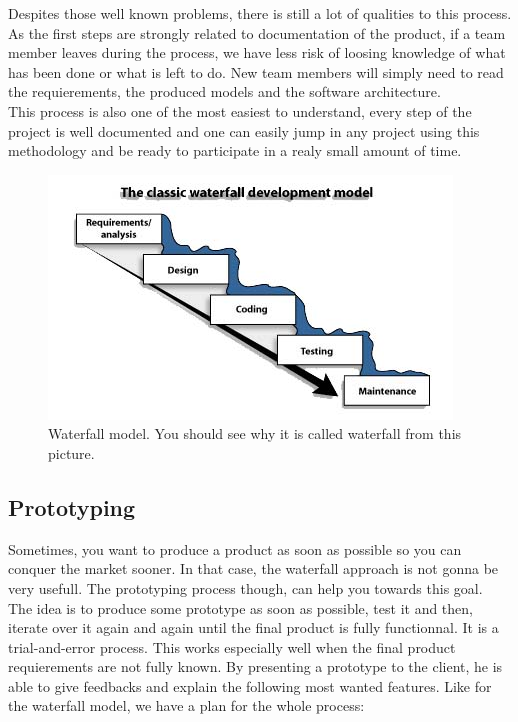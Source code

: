 \documentclass[12pt]{article}
\begin{document}
Despites those well known problems, there is still a lot of qualities to this process. As the first steps are strongly related to documentation of the product, if a team member leaves during the process, we have less risk of loosing knowledge of what has been done or what is left to do. New team members will simply need to read the requierements, the produced models and the software architecture.\\

This process is also one of the most easiest to understand, every step of the project is well documented and one can easily jump in any project using this methodology and be ready to participate in a realy small amount of time.\\

\begin{figure}
    \centering
    \includegraphics[scale=0.8]{waterfall.jpg}
    \caption{Waterfall model. You should see why it is called waterfall from this picture.}
    \label{Waterfall}
\end{figure}

\subsection{Prototyping}

Sometimes, you want to produce a product as soon as possible so you can conquer the market sooner. In that case, the waterfall approach is not gonna be very usefull. The prototyping process though, can help you towards this goal.\\

The idea is to produce some prototype as soon as possible, test it and then, iterate over it again and again until the final product is fully functionnal. It is a trial-and-error process. This works especially well when the final product requierements are not fully known. By presenting a prototype to the client, he is able to give feedbacks and explain the following most wanted features. Like for the waterfall model, we have a plan for the whole process:\\
\end{document}
